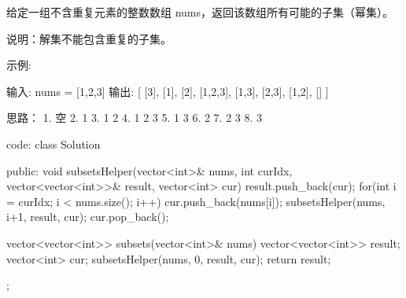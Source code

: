 给定一组不含重复元素的整数数组 nums，返回该数组所有可能的子集（幂集）。

说明：解集不能包含重复的子集。

示例:

输入: nums = [1,2,3]
输出:
[
  [3],
  [1],
  [2],
  [1,2,3],
  [1,3],
  [2,3],
  [1,2],
  []
]




















思路：
1. 空
2. 1
3. 1 2 
4. 1 2 3
5. 1 3
6. 2
7. 2 3
8. 3





















code:
class Solution {
public:
    void subsetsHelper(vector<int>& nums, int curIdx, vector<vector<int>>& result, vector<int> cur)
    {
        result.push_back(cur);
        for(int i = curIdx; i < nums.size(); i++)
        {
            cur.push_back(nums[i]);
            subsetsHelper(nums, i+1, result, cur);
            cur.pop_back();
        }
    }

    vector<vector<int>> subsets(vector<int>& nums) {
        vector<vector<int>> result;
        vector<int> cur;
        subsetsHelper(nums, 0, result, cur);
        return result;
    }
};